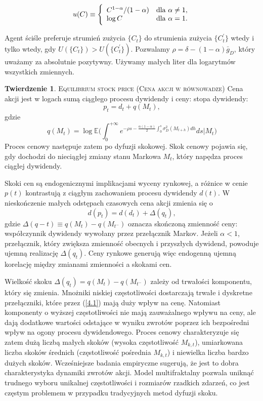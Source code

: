 \documentclass[12pt]{article}
\theoremstyle{definition}
\newtheorem{tw}{Twierdzenie}[section]
\begin{document}
$$u(C) \equiv \Bigg\{ {\begin{array}{l l} 
C^{1-\alpha}/(1-\alpha) & \text{dla} \ \alpha \neq 1,\\
\log{C} & \text{dla} \ \alpha = 1.
\end{array}}$$

Agent ściśle preferuje strumień zużycia $\{C_t\}$ do strumienia zużycia $\{C_{t}^{\prime}\}$ wtedy i tylko wtedy, gdy $U (\{C_t\})> U (\{C_{t}^{\prime}\})$. Pozwalamy $\rho  = \delta- (1-\alpha) \bar{g}_D$, który uważamy za absolutnie pozytywny. Używamy małych liter dla logarytmów wszystkich zmiennych.

\begin{tw}{\textsc{Equilibrium stock price (Cena akcji w równowadze)}} Cena akcji jest w logach sumą ciągłego procesu dywidendy i ceny: stopa dywidendy:
$$p_t = d_t + q(M_t),$$
gdzie
\begin{equation}
\label{4.1}
q(M_t) = \log \mathbb{E} \Big( \int_{0}^{+\infty} e^{- \rho s - \frac{\alpha(1 - \alpha)}{2} \int_{0}^{s} \sigma_{D}^{2}(M_{t+h}) {dh}} ds \Big| M_t \Big)
\end{equation}
Proces cenowy następuje zatem po dyfuzji skokowej. Skok cenowy pojawia się, gdy dochodzi do nieciągłej zmiany stanu Markowa $M_t$, który napędza proces ciągłej dywidendy.
\end{tw}

Skoki cen są endogenicznymi implikacjami wyceny rynkowej, a różnice w cenie $p(t)$ kontrastują z ciągłym zachowaniem procesu dywidendy $d(t)$. W nieskończenie małych odstępach czasowych cena akcji zmienia się o
$$d(p_t) = d(d_t) + \Delta (q_t),$$
gdzie $\Delta(q-t) \equiv q(M_t) - q (M_{t^-})$ oznacza skończoną zmienność ceny: współczynnik dywidendy wywołany przez przełącznik Markov. Jeżeli $\alpha <1$, przełącznik, który zwiększa zmienność obecnych i przyszłych dywidend, powoduje ujemną realizację $\Delta(q_t)$. Ceny rynkowe generują więc endogenną ujemną korelację między zmianami zmienności a skokami cen.

Wielkość skoku $\Delta (q_t) = q (M_t) - q (M_{t^-})$ zależy od trwałości komponentu, który się zmienia. Mnożniki niskiej częstotliwości dostarczają trwałe i dyskretne przełączniki, które przez (\ref{4.1}) mają duży wpływ na cenę. Natomiast komponenty o wyższej częstotliwości nie mają zauważalnego wpływu na ceny, ale dają dodatkowe wartości odstające w wyniku zwrotów poprzez ich bezpośredni wpływ na ogony procesu dywidendowego. Proces cenowy charakteryzuje się zatem dużą liczbą małych skoków (wysoka częstotliwość $M_{k, t}$), umiarkowana liczba skoków średnich (częstotliwość pośrednia $M_{k, t}$) i niewielka liczba bardzo dużych skoków. Wcześniejsze badania empiryczne sugerują, że jest to dobra charakterystyka dynamiki zwrotów akcji. Model multifraktalny pozwala uniknąć trudnego wyboru unikalnej częstotliwości i rozmiarów rzadkich zdarzeń, co jest częstym problemem w przypadku tradycyjnych metod dyfuzji skoku.
\end{document}
